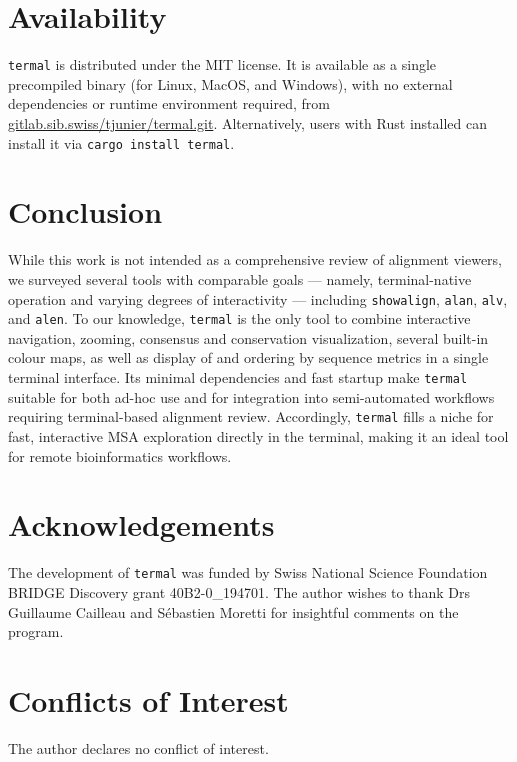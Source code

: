 \documentclass[11pt]{article}
\begin{document}
\section*{Availability}

\texttt{termal} is distributed under the MIT license. It is available as a
single precompiled binary (for Linux, MacOS, and Windows), with no external
dependencies or runtime environment required, from
\url{gitlab.sib.swiss/tjunier/termal.git}. Alternatively, users with Rust
installed can install it via \texttt{cargo install termal}.

\section*{Conclusion}

While this work is not intended as a comprehensive review of alignment viewers,
we surveyed several tools with comparable goals — namely, terminal-native
operation and varying degrees of interactivity — including \texttt{showalign},
\texttt{alan}, \texttt{alv}, and \texttt{alen}.  To our knowledge,
\texttt{termal} is the only tool to combine interactive navigation, zooming,
consensus and conservation visualization, several built-in colour maps, as well
as display of and ordering by sequence metrics in a single terminal interface.
Its minimal dependencies and fast startup make \texttt{termal} suitable for both
ad-hoc use and for integration into semi-automated workflows requiring
terminal-based alignment review. Accordingly, \texttt{termal} fills a niche for
fast, interactive MSA exploration directly in the terminal, making it an ideal
tool for remote bioinformatics workflows.

\section*{Acknowledgements}

The development of \texttt{termal} was funded by Swiss National Science
Foundation BRIDGE Discovery grant 40B2-0\_194701.  The author wishes to thank
Drs Guillaume Cailleau and Sébastien Moretti for insightful comments on the
program.

\section*{Conflicts of Interest}

The author declares no conflict of interest.


\end{document}
